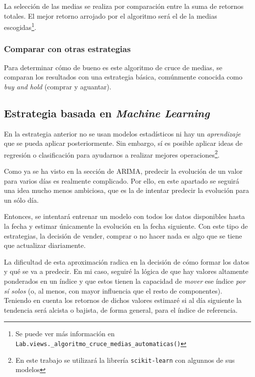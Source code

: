 La selección de las medias se realiza por comparación entre la suma de retornos totales. El mejor retorno arrojado por el algoritmo será el de la medias escogidas\footnote{Se puede ver más información en \texttt{Lab.views.\_algoritmo\_cruce\_medias\_automaticas()}}. 


\subsubsection{Comparar con otras estrategias}

Para determinar cómo de bueno es este algoritmo de cruce de medias, se comparan los resultados con una estrategia básica, comúnmente conocida como \emph{buy and hold} (comprar y aguantar)\citep{wiki:buy_and_hold}.


\subsection{Estrategia basada en \emph{Machine Learning}}

En la estrategia anterior no se usan modelos estadísticos ni hay un \emph{aprendizaje} que se pueda aplicar posteriormente. Sin embargo, sí es posible aplicar ideas de regresión o clasificación para ayudarnos a realizar mejores operaciones\footnote{En este trabajo se utilizará la librería \texttt{scikit-learn} con algunnos de sus modelos}. 

Como ya se ha visto en la sección de ARIMA, predecir la evolución de un valor para varios días es realmente complicado. Por ello, en este apartado se seguirá una idea mucho menos ambiciosa, que es la de intentar predecir la evolución para un sólo día. 

Entonces, se intentará entrenar un modelo con todos los datos disponibles hasta la fecha y estimar únicamente la evolución en la fecha siguiente. Con este tipo de estrategias, la decisión de vender, comprar o no hacer nada es algo que se tiene que actualizar diariamente.

La dificultad de esta aproximación radica en la decisión de cómo formar los datos y qué se va a predecir. En mi caso, seguiré la lógica de que hay valores altamente ponderados en un índice y que estos tienen la capacidad de \emph{mover} ese índice \emph{por sí solos} (o, al menos, con mayor influencia que el resto de componentes). Teniendo en cuenta los retornos de dichos valores estimaré si al día siguiente la tendencia será alcista o bajista, de forma general, para el índice de referencia. 

